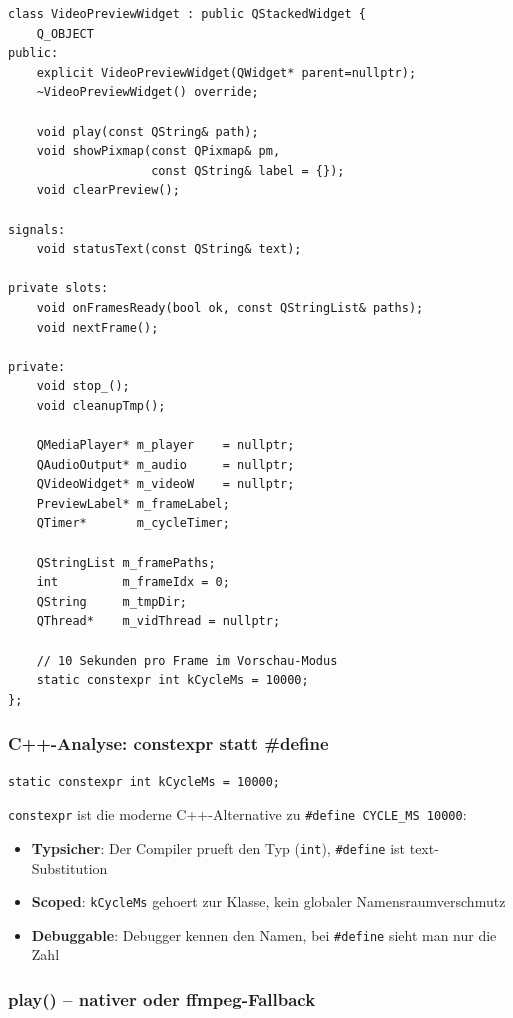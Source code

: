 \begin{lstlisting}[style=header, caption={videopreviewwidget.h}]
class VideoPreviewWidget : public QStackedWidget {
    Q_OBJECT
public:
    explicit VideoPreviewWidget(QWidget* parent=nullptr);
    ~VideoPreviewWidget() override;

    void play(const QString& path);
    void showPixmap(const QPixmap& pm,
                    const QString& label = {});
    void clearPreview();

signals:
    void statusText(const QString& text);

private slots:
    void onFramesReady(bool ok, const QStringList& paths);
    void nextFrame();

private:
    void stop_();
    void cleanupTmp();

    QMediaPlayer* m_player    = nullptr;
    QAudioOutput* m_audio     = nullptr;
    QVideoWidget* m_videoW    = nullptr;
    PreviewLabel* m_frameLabel;
    QTimer*       m_cycleTimer;

    QStringList m_framePaths;
    int         m_frameIdx = 0;
    QString     m_tmpDir;
    QThread*    m_vidThread = nullptr;

    // 10 Sekunden pro Frame im Vorschau-Modus
    static constexpr int kCycleMs = 10000;
};
\end{lstlisting}

\subsubsection{C++-Analyse: constexpr statt \#define}

\begin{lstlisting}
static constexpr int kCycleMs = 10000;
\end{lstlisting}

\verb|constexpr| ist die moderne C++-Alternative zu
\verb|#define CYCLE_MS 10000|:
\begin{itemize}[noitemsep]
  \item \textbf{Typsicher}: Der Compiler prueft den Typ
    (\verb|int|), \verb|#define| ist text-Substitution
  \item \textbf{Scoped}: \verb|kCycleMs| gehoert zur
    Klasse, kein globaler Namensraumverschmutz
  \item \textbf{Debuggable}: Debugger kennen den Namen,
    bei \verb|#define| sieht man nur die Zahl
\end{itemize}

\subsubsection{play() -- nativer oder ffmpeg-Fallback}

